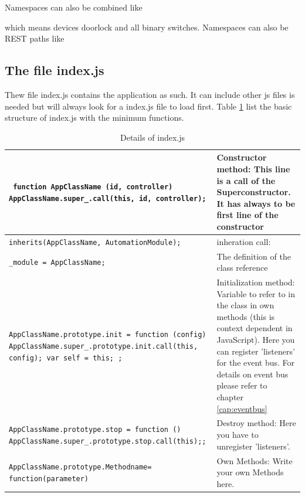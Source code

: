 Namespaces can also be combined like


which means devices doorlock and all binary switches.
Namespaces can also be REST paths like



\subsection{The file index.js}

Thew file index.js contains the application as such. It can include other js files is needed 
but \zway will always look for a index.js file to load first. Table \ref{tab:detailindexjs}
list the basic structure of index.js with the minimum functions.


\begin{table}
\begin{tabular}{|p{}|p{}|}
\hline
\texttt{\tiny 
function AppClassName (id, controller) {AppClassName.super\_.call(this, id, controller);} }&
Constructor method:
This line is a call of the Superconstructor. It has always to be first line of the constructor \\
\hline
\texttt{\tiny inherits(AppClassName, AutomationModule); }
&
inheration call: \\
\hline
\texttt{\tiny \_module = AppClassName;} &
The definition of the class reference \\
\hline
\texttt{\tiny AppClassName.prototype.init = function (config) {
AppClassName.super\_.prototype.init.call(this, config);
var self = this; }; }&
Initialization method: Variable to refer to in the class in own
methods (this is context dependent in JavaScript).
Here you can register 'listeners' for the event bus. For details on event bus please 
refer to chapter \ref{cap:eventbus} \\
\hline

\texttt{\tiny AppClassName.prototype.stop = function () {
AppClassName.super\_.prototype.stop.call(this);}; }&
Destroy method:
Here you have to unregister 'listeners'.  \\
\hline
\texttt{\tiny AppClassName.prototype.Methodname=
function(parameter) }&
Own Methods: Write your own Methods here. \\
\hline
\end{tabular}
\caption{Details of index.js} 
\label{tab:detailindexjs}
\end{table}	
	

